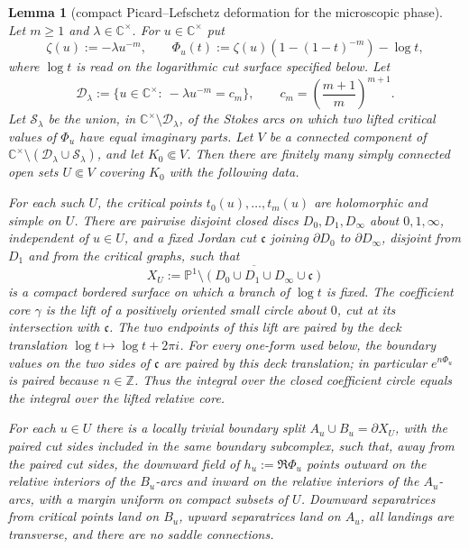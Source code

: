 \documentclass[reqno]{article}
\newtheorem{lem}[theorem]{Lemma}
\theoremstyle{definition}
\theoremstyle{remark}
\theoremstyle{plain}
\newcommand{\C}{\mathbb C}
\begin{document}
\begin{lem}[compact Picard--Lefschetz deformation for the microscopic phase]\label{lem:micro-compact-pl}
Let $m\ge1$ and $\lambda\in\C^\times$. For $u\in\C^\times$ put
\[
\zeta(u):=-\lambda u^{-m},\qquad
\Phi_u(t):=\zeta(u)(1-(1-t)^{-m})-\log t,
\]
where \(\log t\) is read on the logarithmic cut surface specified below. Let
\[
\mathcal D_\lambda:=\{u\in\C^\times:\ -\lambda u^{-m}=c_m\},
\qquad c_m=\left(\frac{m+1}{m}\right)^{m+1}.
\]
Let $\mathcal S_\lambda$ be the union, in $\C^\times\setminus\mathcal D_\lambda$, of the Stokes arcs on which two lifted critical values of $\Phi_u$ have equal imaginary parts. Let $V$ be a connected component of $\C^\times\setminus(\mathcal D_\lambda\cup\mathcal S_\lambda)$, and let $K_0\Subset V$. Then there are finitely many simply connected open sets $U\Subset V$ covering $K_0$ with the following data.

For each such $U$, the critical points $t_0(u),\ldots,t_m(u)$ are holomorphic and simple on $U$. There are pairwise disjoint closed discs \(D_0,D_1,D_\infty\) about \(0,1,\infty\), independent of \(u\in U\), and a fixed Jordan cut \(\mathfrak c\) joining \(\partial D_0\) to \(\partial D_\infty\), disjoint from \(D_1\) and from the critical graphs, such that
\[
X_U:=\overline{\mathbb P^1\setminus(D_0\cup D_1\cup D_\infty\cup\mathfrak c)}
\]
is a compact bordered surface on which a branch of \(\log t\) is fixed. The coefficient core \(\gamma\) is the lift of a positively oriented small circle about \(0\), cut at its intersection with \(\mathfrak c\). The two endpoints of this lift are paired by the deck translation \(\log t\mapsto\log t+2\pi i\). For every one-form used below, the boundary values on the two sides of \(\mathfrak c\) are paired by this deck translation; in particular \(e^{n\Phi_u}\) is paired because \(n\in\mathbb Z\). Thus the integral over the closed coefficient circle equals the integral over the lifted relative core.

For each \(u\in U\) there is a locally trivial boundary split \(A_u\cup B_u=\partial X_U\), with the paired cut sides included in the same boundary subcomplex, such that, away from the paired cut sides, the downward field of \(h_u:=\Re\Phi_u\) points outward on the relative interiors of the \(B_u\)-arcs and inward on the relative interiors of the \(A_u\)-arcs, with a margin uniform on compact subsets of \(U\). Downward separatrices from critical points land on \(B_u\), upward separatrices land on \(A_u\), all landings are transverse, and there are no saddle connections.


\end{lem}
\end{document}
